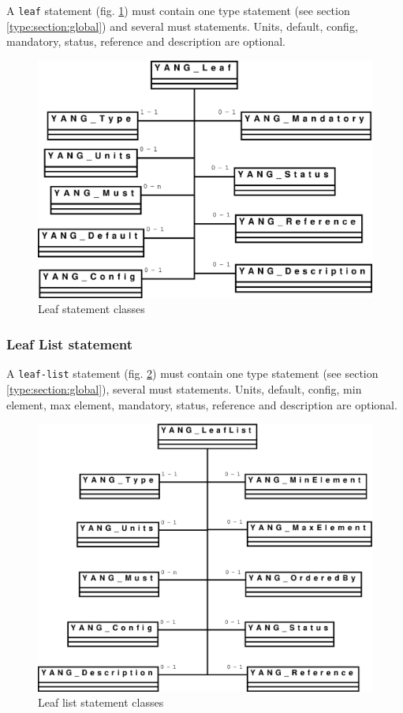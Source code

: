 \documentclass[a4paper]{article}
\begin{document}
A  {\tt  leaf}  statement  (fig.  \ref{leaf}) must  contain  one  type
statement  (see section  \ref{type:section:global})  and several  must
statements.  Units, default,  config, mandatory, status, reference and
description are optional.
\begin{figure}[htbp]
\begin{center}
\includegraphics[scale = .3]{leaf.eps}
\end{center}
\caption{Leaf statement classes}
\label{leaf}
\end{figure}

\subsubsection{Leaf List statement}

A {\tt  leaf-list} statement  (fig.  \ref{leaflist}) must  contain one
type statement  (see section \ref{type:section:global}),  several must
statements.   Units,  default,   config,  min  element,  max  element,
mandatory, status, reference and description are optional.
\begin{figure}[htbp]
\begin{center}
\includegraphics[scale = .3]{leaflist.eps}
\end{center}
\caption{Leaf list statement classes}
\label{leaflist}
\end{figure}
\end{document}
